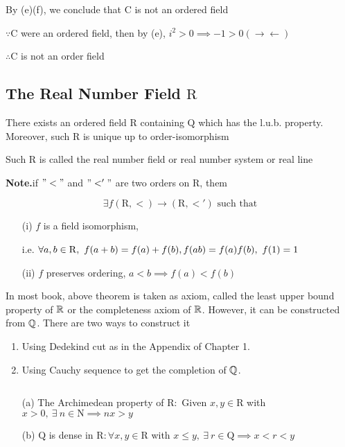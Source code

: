 \newpage

\begin{rmk*}
	By (e)(f), we conclude that $\mathrm{C}$ is not an ordered field
	
	$\because \mathrm{C}$ were an ordered field, then by (e), $i^2>0 \implies -1 > 0(\rightarrow\leftarrow)$
	
	$\therefore \mathrm{C}$ is not an order field
\end{rmk*}


\subsection{The Real Number Field $\mathrm{R}$}

\begin{thm*}
	There exists an ordered field $\mathrm{R}$ containing $\mathrm{Q}$ which has the l.u.b. property. Moreover, such $\mathrm{R}$ is unique up to order-isomorphism
	
	Such $\mathrm{R}$ is called the real number field or real number system or real line
\end{thm*}

\textbf{Note.}if $"<"$ and $"<'"$ are two orders on $\mathrm{R}$, them 

$$\exists f(\mathrm{R},<) \rightarrow (\mathrm{R},<') \text{ such that}$$
	
	\begin{enumerate}
		\item[(i)] $f$ is a field isomorphism,
		
		 i.e. $\forall a,b \in \mathrm{R},~f(a+b)=f(a)+f(b), \\ f(ab) = f(a)f(b),~f(1)=1$
		\item[(ii)] $f$ preserves ordering, $a<b \implies f(a) < f(b)$ 
	\end{enumerate}
	
	 In most book, above theorem is taken as axiom, called the least upper bound property of $\mathbb{R}$ or the completeness axiom of $\mathbb{R}$. However, it can be constructed from $\mathbb{Q}$. There are two ways to construct it
	
	\begin{enumerate}
		\item Using Dedekind cut as in the Appendix of Chapter 1.
		\item Using Cauchy sequence to get the completion of $\mathbb{Q}$.
	\end{enumerate}

\begin{thm*}$ $
	\begin{enumerate}
		\item[\color{red}(a)] The Archimedean  property of $\mathrm{R}:$ Given $x,y \in \mathrm{R}$ with $x>0,~\exists~n \in \mathrm{N} \implies nx>y$
		\item[(b)] $\mathrm{Q}$ is dense in $\mathrm{R}: \forall x,y\in \mathrm{R}$ with $x \leq y,~\exists ~r \in \mathrm{Q} \implies x < r < y$
	\end{enumerate}
\end{thm*}

